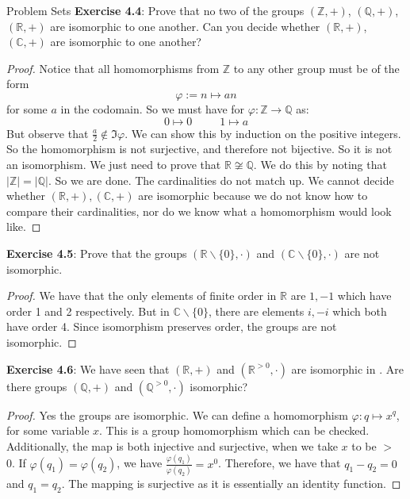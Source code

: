 \documentclass{report}
\begin{document}
\begin{exercises}{Problem Sets}
    \textbf{Exercise 4.4}: Prove that no two of the groups $(\mathbb{Z}, +)$, $(\mathbb{Q}, +)$, $(\mathbb{R}, +)$ are isomorphic to one another. Can you decide whether $(\mathbb{R}, +)$, $(\mathbb{C}, +)$ are isomorphic to one another?
        \begin{proof}
            Notice that all homomorphisms from $\mathbb{Z}$ to any other group must be of the form 
                \begin{equation*}
                    \varphi := n \mapsto an
                \end{equation*}
            for some $a$ in the codomain. So we must have for $\varphi : \mathbb{Z} \rightarrow \mathbb{Q}$ as: 
                \begin{equation*}
                    0 \mapsto 0 \hspace{30pt} 1 \mapsto a
                \end{equation*}
            But observe that $\frac{a}{2} \notin \Im{\varphi}$. We can show this by induction on the positive integers. So the homomorphism is not surjective, and therefore not bijective. So it is not an isomorphism. We just need to prove that $\mathbb{R} \not\cong \mathbb{Q}$. We do this by noting that $\lvert \mathbb{Z} \rvert = \lvert \mathbb{Q} \rvert$. So we are done. The cardinalities do not match up. We cannot decide whether $(\mathbb{R}, +), (\mathbb{C}, +)$ are isomorphic because we do not know how to compare their cardinalities, nor do we know what a homomorphism would look like.
        \end{proof}

    \textbf{Exercise 4.5}: Prove that the groups $(\mathbb{R} \backslash \{0\}, \cdot)$ and $(\mathbb{C} \backslash \{0\}, \cdot)$ are not isomorphic.
        \begin{proof}
            We have that the only elements of finite order in $\mathbb{R}$ are $1, -1$ which have order 1 and 2 respectively. But in $\mathbb{C} \backslash \{0\}$, there are elements $i, -i$ which both have order 4. Since isomorphism preserves order, the groups are not isomorphic.
        \end{proof}

    \textbf{Exercise 4.6}: We have seen that $(\mathbb{R}, +)$ and $(\mathbb{R}^{> 0}, \cdot )$ are isomorphic in . Are there groups $(\mathbb{Q}, +)$ and $(\mathbb{Q}^{> 0}, \cdot )$ isomorphic?
        \begin{proof}
            Yes the groups are isomorphic. We can define a homomorphism $\varphi : q \mapsto x^{q}$, for some variable $x$. This is a group homomorphism which can be checked. Additionally, the map is both injective and surjective, when we take $x$ to be $>$ 0. If $\varphi(q_{1}) = \varphi(q_{2})$, we have $\frac{\varphi(q_{1})}{\varphi(q_{2})} = x^{0}$. Therefore, we have that $q_{1} - q_{2} = 0$ and $q_{1} = q_{2}$. The mapping is surjective as it is essentially an identity function.
        \end{proof}


\end{exercises}
\end{document}
